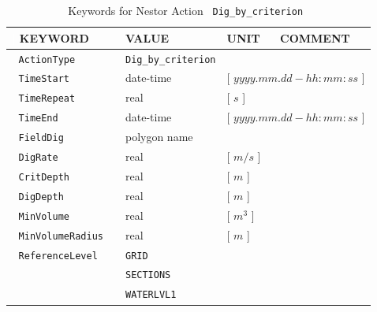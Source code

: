 \begin{table}[ht]
\centering
\caption{Keywords for Nestor Action \texttt{~Dig\_by\_criterion~}}
\begin{tabular}{| l | l | l | l | p{2.6cm} |}
\hline
{\textcolor{white}{\LARGE |}} \textbf{KEYWORD}        &     &\textbf{VALUE}         &\textbf{UNIT}          &\textbf{COMMENT}     \\ \hline
{\textcolor{white}{\LARGE |}} \texttt{ActionType}     &     &\texttt{Dig\_by\_criterion}&                   &                     \\ \hline
{\textcolor{white}{\LARGE |}} \texttt{TimeStart}      &     &date-time              &\multicolumn{2}{l|}{[ $yyyy.mm.dd-hh:mm:ss$ ]} \\ \hline
{\textcolor{white}{\LARGE |}} \texttt{TimeRepeat}     &     &real                   &[ $s$ ]                &                     \\ \hline
{\textcolor{white}{\LARGE |}} \texttt{TimeEnd}        &     &date-time              &\multicolumn{2}{l|}{[ $yyyy.mm.dd-hh:mm:ss$ ]} \\ \hline
{\textcolor{white}{\LARGE |}} \texttt{FieldDig}       &     &polygon name           &                       &                     \\ \hline
{\textcolor{white}{\LARGE |}} \texttt{DigRate}        &     &real                   &[ $m/s$ ]              &                     \\ \hline
{\textcolor{white}{\LARGE |}} \texttt{CritDepth}      &     &real                   &[ $m$ ]                &                     \\ \hline
{\textcolor{white}{\LARGE |}} \texttt{DigDepth}       &     &real                   &[ $m$ ]                &                     \\ \hline
{\textcolor{white}{\LARGE |}} \texttt{MinVolume}      &     &real                   &[ $m^3$ ]              &                     \\ \hline
{\textcolor{white}{\LARGE |}} \texttt{MinVolumeRadius}&     &real                   &[ $m$ ]                &                     \\ \hline
{\textcolor{white}{\LARGE |}} \texttt{ReferenceLevel} &     &\texttt{GRID}          &                       &                     \\
{\textcolor{white}{\LARGE |}}                         &     &\texttt{SECTIONS}      &                       &                     \\
{\textcolor{white}{\LARGE |}}                         &     &\texttt{WATERLVL1}     &                       &                     \\

\end{tabular}
\end{table}
